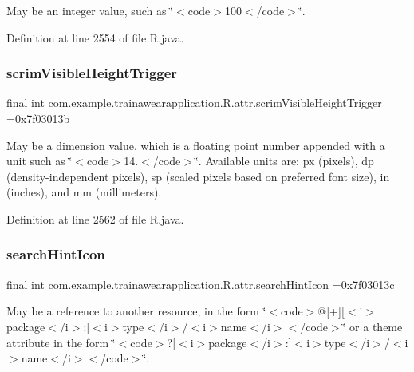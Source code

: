 May be an integer value, such as \char`\"{}$<$code$>$100$<$/code$>$\char`\"{}. 

Definition at line 2554 of file R.\+java.

\mbox{\label{classcom_1_1example_1_1trainawearapplication_1_1_r_1_1attr_a07ad69347e048de70fa584d4a12af24c}} 
\subsubsection{\texorpdfstring{scrimVisibleHeightTrigger}{scrimVisibleHeightTrigger}}
{\footnotesize\ttfamily final int com.\+example.\+trainawearapplication.\+R.\+attr.\+scrim\+Visible\+Height\+Trigger =0x7f03013b\hspace{0.3cm}{\ttfamily [static]}}

May be a dimension value, which is a floating point number appended with a unit such as \char`\"{}$<$code$>$14.\+5sp$<$/code$>$\char`\"{}. Available units are\+: px (pixels), dp (density-\/independent pixels), sp (scaled pixels based on preferred font size), in (inches), and mm (millimeters). 

Definition at line 2562 of file R.\+java.

\mbox{\label{classcom_1_1example_1_1trainawearapplication_1_1_r_1_1attr_acedf5e07b00d287e7806dee9744b1452}} 
\subsubsection{\texorpdfstring{searchHintIcon}{searchHintIcon}}
{\footnotesize\ttfamily final int com.\+example.\+trainawearapplication.\+R.\+attr.\+search\+Hint\+Icon =0x7f03013c\hspace{0.3cm}{\ttfamily [static]}}

May be a reference to another resource, in the form \char`\"{}$<$code$>$@\mbox{[}+\mbox{]}\mbox{[}$<$i$>$package$<$/i$>$\+:\mbox{]}$<$i$>$type$<$/i$>$/$<$i$>$name$<$/i$>$$<$/code$>$\char`\"{} or a theme attribute in the form \char`\"{}$<$code$>$?\mbox{[}$<$i$>$package$<$/i$>$\+:\mbox{]}$<$i$>$type$<$/i$>$/$<$i$>$name$<$/i$>$$<$/code$>$\char`\"{}. 

